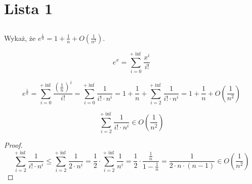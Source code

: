 \documentclass[svgnames]{article}
\begin{document}


\section{Lista 1}
\subsection{}%
\subsection{}%
\subsection{}%
\subsection{}%
\subsection{}%
\subsection{}%
\begin{framed}
Wykaż, że  $e^{\frac{1}{n}} = 1 + \frac{1}{n} + O(\frac{1}{n^2})$.
\end{framed}

\begin{equation}
e^x = \sum\limits_{i=0}^{+\inf} \frac{x^i}{i!}
\end{equation}

\begin{equation}
e^{\frac{1}{n}} = \sum\limits_{i=0}^{+\inf} \frac{ (\frac{1}{n})^i }{i!} = \sum\limits_{i=0}^{+\inf} \frac{1}{i! \cdot n^i} = 1 + \frac{1}{n} + \sum\limits_{i=2}^{+\inf} \frac{1}{i! \cdot n^i} = 1 + \frac{1}{n} + O(\frac{1}{n^2})
\end{equation}


\begin{equation*}
	\sum\limits_{i=2}^{+\inf} \frac{1}{i! \cdot n^i} \in O(\frac{1}{n^2})
\end{equation*}
\begin{proof}

\begin{equation*}
\sum\limits_{i=2}^{+\inf} \frac{1}{i! \cdot n^i} \leqslant \sum\limits_{i=2}^{+\inf} \frac{1}{2 \cdot n^i} = \frac{1}{2} \cdot \sum\limits_{i=2}^{+\inf} \frac{1}{n^i} = \frac{1}{2} \cdot \frac{ \frac{1}{n} }{ 1 - \frac{1}{n} } = \frac{1}{2 \cdot n \cdot (n-1)} \in O(\frac{1}{n^2})
\end{equation*}

\end{proof}
\end{document}
